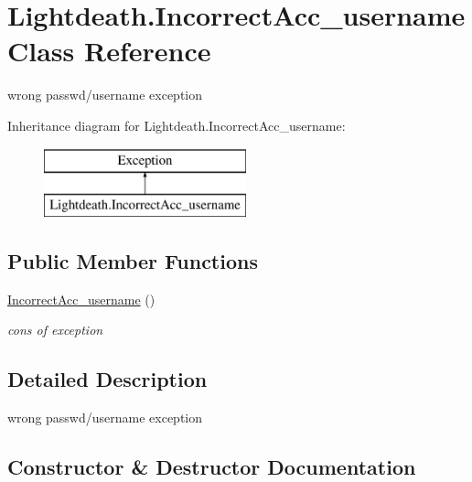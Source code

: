 \hypertarget{class_lightdeath_1_1_incorrect_acc__username}{}\section{Lightdeath.\+Incorrect\+Acc\+\_\+username Class Reference}
\label{class_lightdeath_1_1_incorrect_acc__username}


wrong passwd/username exception  


Inheritance diagram for Lightdeath.\+Incorrect\+Acc\+\_\+username\+:\begin{figure}[H]
\begin{center}
\leavevmode
\includegraphics[height=2.000000cm]{class_lightdeath_1_1_incorrect_acc__username}
\end{center}
\end{figure}
\subsection*{Public Member Functions}
\begin{DoxyCompactItemize}
\item 
\hyperlink{class_lightdeath_1_1_incorrect_acc__username_a614e97d7c858d3feb8bf905155a6c9c1}{Incorrect\+Acc\+\_\+username} ()
\begin{DoxyCompactList}\small\item\em cons of exception \end{DoxyCompactList}\end{DoxyCompactItemize}


\subsection{Detailed Description}
wrong passwd/username exception 



\subsection{Constructor \& Destructor Documentation}
\hypertarget{class_lightdeath_1_1_incorrect_acc__username_a614e97d7c858d3feb8bf905155a6c9c1}{}\label{class_lightdeath_1_1_incorrect_acc__username_a614e97d7c858d3feb8bf905155a6c9c1} 
